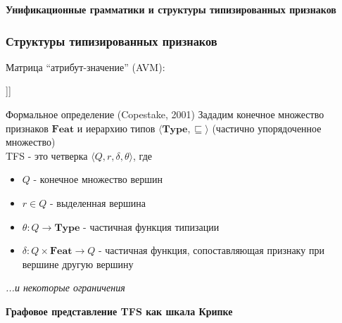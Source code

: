 \documentclass{beamer}
\begin{document}
\begin{frame}{}
\begin{center}
	\textbf{Унификационные грамматики и структуры типизированных признаков}
\end{center}
\end{frame}

\begin{frame}[fragile]
\frametitle{Структуры типизированных признаков}
Матрица ``атрибут-значение'' (AVM):\\
\begin{center}
	\begin{avm}
	[{action} predicate & on \cr
    	      Mood & imp \cr 
        	  Actor & @{1} \cr 
	          Patient & [{thing} predicate & @{2} лампа \cr
    	                         Num & sg \cr 
        	                     Modifier & [{q-color} predicate & красный\_adj ]]]
	\end{avm}
\end{center}	
\end{frame}

\begin{frame}{Формальное определение (Copestake, 2001)}
Зададим конечное множество признаков $\textbf{Feat}$ и иерархию типов $\langle \textbf{Type}, \sqsubseteq \rangle$ (частично упорядоченное множество)\\
\bigskip
TFS - это четверка $\langle Q, r, \delta, \theta \rangle$, где
\begin{itemize}
	\item $Q$ - конечное множество вершин
	\item $r \in Q$ - выделенная вершина
	\item $\theta : Q \to \textbf{Type}$ - частичная функция типизации
	\item $\delta : Q \times \textbf{Feat} \to Q$ - частичная функция, сопоставляющая признаку при вершине другую вершину
\end{itemize}
\bigskip
{\footnotesize \textit{...и некоторые ограничения}}
\end{frame}

\begin{frame}{}
\begin{center}
	\textbf{Графовое представление TFS как шкала Крипке}
\end{center}
\end{frame}
\end{document}
